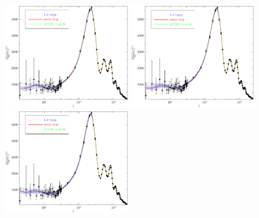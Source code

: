 \documentclass[11pt]{article}
\def \halffigwidth{0.48\textwidth}
\begin{document}
\begin{figure}
\includegraphics[width = \halffigwidth]{nobicep_spline0_p11_r0d02_clTT_trajs.pdf}%
\includegraphics[width = \halffigwidth]{nobicep_spline0_p11_r0d2_clTT_trajs.pdf}
\includegraphics[width = \halffigwidth]{nobicep_spline0_p11_r0d5_clTT_trajs.pdf}%

\end{figure}
\end{document}
